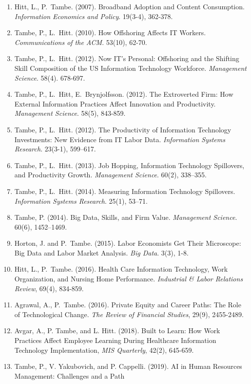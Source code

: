 \documentclass[10pt,letterpaper]{article}
\begin{document}
\begin{enumerate}
\item Hitt, L., P.~Tambe. (2007).
  Broadband Adoption and Content Consumption. \textit{Information Economics and Policy}. 19(3-4), 362-378.
\item Tambe, P., L.~Hitt. (2010).
  How Offshoring Affects IT Workers. \textit{Communications of the ACM}. 53(10), 62-70.
\item Tambe, P., L.~Hitt. (2012).
  Now IT's Personal: Offshoring and the Shifting Skill Composition of the US Information Technology Workforce.
  \textit{Management Science}. 58(4). 678-697.
\item Tambe, P., L.~Hitt, E.~Brynjolfsson. (2012).
 The Extroverted Firm: How External Information Practices Affect Innovation and Productivity.
  \textit{Management Science}. 58(5), 843-859.
\item Tambe, P., L.~Hitt. (2012).
  The Productivity of Information Technology Investments: New Evidence from IT Labor Data.
  \textit{Information Systems Research}. 23(3-1), 599--617.
\item Tambe, P., L.~Hitt. (2013).
Job Hopping, Information Technology Spillovers, and Productivity Growth.
  \textit{Management Science}. 60(2), 338--355.
\item Tambe, P., L.~Hitt. (2014). Measuring Information Technology Spillovers. \textit{Information Systems Research}.
25(1), 53--71.
\item Tambe, P. (2014). Big Data, Skills, and Firm Value.
  \textit{Management Science}. 60(6), 1452--1469.
\item Horton, J. and P.~Tambe. (2015).
  Labor Economists Get Their Microscope: Big Data and Labor Market Analysis.
  \textit{Big Data}. 3(3), 1-8.
\item Hitt, L., P.~Tambe. (2016).
  Health Care Information Technology, Work Organization, and Nursing Home Performance.
  \textit{Industrial \& Labor Relations Review}, 69(4), 834-859.
\item Agrawal, A., P.~Tambe. (2016).
  Private Equity and Career Paths: The Role of Technological Change.
  \textit{The Review of Financial Studies}, 29(9), 2455-2489.
\item Avgar, A., P. Tambe, and L. Hitt. (2018).
  Built to Learn: How Work Practices Affect Employee Learning During
  Healthcare Information Technology Implementation, \textit{MIS Quarterly},
  42(2), 645-659.
\item Tambe, P., V. Yakubovich, and P. Cappelli. (2019).
  AI in Human Resources Management: Challenges and a Path

\end{enumerate}
\end{document}
